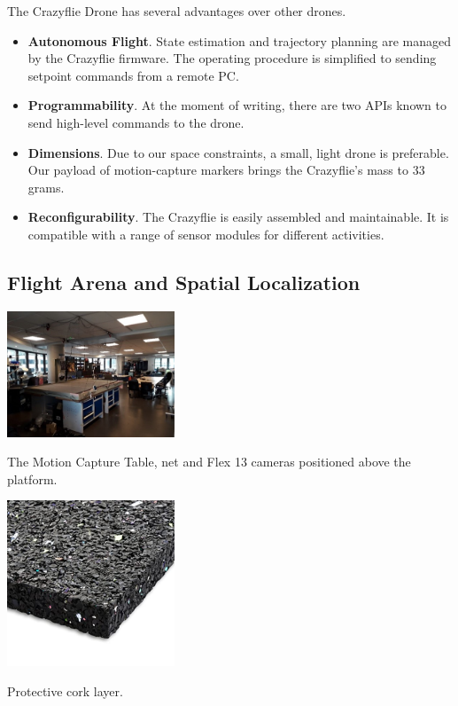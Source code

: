 The Crazyflie Drone has several advantages over other drones.

\begin{itemize}
    \item	\textbf{Autonomous Flight}. State estimation and trajectory planning are managed by the Crazyflie firmware. The operating procedure is simplified to sending setpoint commands from a remote PC. \cite{crazyflie_docs}
    \item	\textbf{Programmability}. At the moment of writing, there are two APIs known to send high-level commands to the drone. \cite{crazyflie_docs}
    \item   \textbf{Dimensions}. Due to our space constraints, a small, light  drone is preferable. Our payload of motion-capture markers brings the Crazyflie’s mass to 33 grams. 
    \item   \textbf{Reconfigurability}. The Crazyflie is easily assembled and maintainable. It is compatible with a range of sensor modules for different activities. \cite{crazyflie_docs} 
\end{itemize}

\subsection{Flight Arena and Spatial Localization}
\begin{marginfigure}%
  \includegraphics[width=5cm]{images/testbed/platform.jpg}
  \caption{The Motion Capture Table, net and Flex 13 cameras positioned above the platform.  }
  \label{fig:flight_arena}
\end{marginfigure}

\begin{marginfigure}
  \includegraphics[width=5cm]{images/testbed/camera_layout/cork_material.png}
  \caption{Protective cork layer.}
  \label{fig:cork}
\end{marginfigure}


